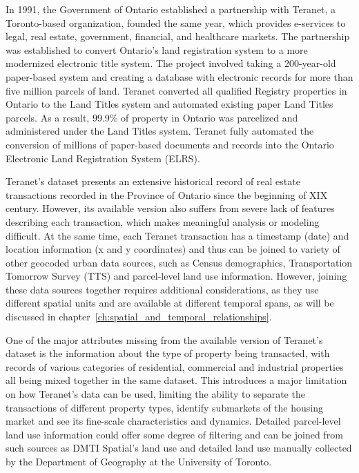 In 1991, the Government of Ontario established a partnership with Teranet, a Toronto-based organization, founded the same year, which provides e-services to legal, real estate, government, financial, and healthcare markets.
The partnership was established to convert Ontario's land registration system to a more modernized electronic title system.
The project involved taking a 200-year-old paper-based system and creating a database with electronic records for more than five million parcels of land.
Teranet converted all qualified Registry properties in Ontario to the Land Titles system and automated existing paper Land Titles parcels.
As a result, 99.9\% of property in Ontario was parcelized and administered under the Land Titles system.
Teranet fully automated the conversion of millions of paper-based documents and records into the Ontario Electronic Land Registration System (ELRS)\cite{TeranetEnterprisesInc.2019}.

Teranet's dataset presents an extensive historical record of real estate transactions recorded in the Province of Ontario since the beginning of XIX century.
However, its available version also suffers from severe lack of features describing each transaction, which makes meaningful analysis or modeling difficult.
At the same time, each Teranet transaction has a timestamp (date) and location information (x and y coordinates) and thus can be joined to variety of other geocoded urban data sources, such as Census demographics, Transportation Tomorrow Survey (TTS) and parcel-level land use information.
However, joining these data sources together requires additional considerations, as they use different spatial units and are available at different temporal spans, as will be discussed in chapter~\ref{ch:spatial_and_temporal_relationships}.

One of the major attributes missing from the available version of Teranet's dataset is the information about the type of property being transacted, with records of various categories of residential, commercial and industrial properties all being mixed together in the same dataset.
This introduces a major limitation on how Teranet's data can be used, limiting the ability to separate the transactions of different property types, identify submarkets of the housing market and see its fine-scale characteristics and dynamics.
Detailed parcel-level land use information could offer some degree of filtering and can be joined from such sources as DMTI Spatial's land use and detailed land use manually collected by the Department of Geography at the University of Toronto.

